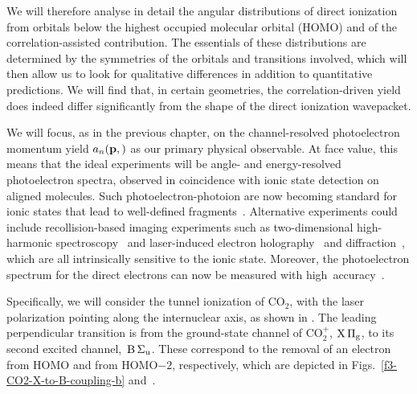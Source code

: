 We will therefore analyse in detail the angular distributions of direct ionization from orbitals below the highest occupied molecular orbital (HOMO) and of the correlation-assisted contribution. The essentials of these distributions are determined by the symmetries of the orbitals and transitions involved, which will then allow us to look for qualitative differences in addition to quantitative predictions. We will find that, in certain geometries, the correlation-driven yield does indeed differ significantly from the shape of the direct ionization wavepacket.


We will focus, as in the previous chapter, on the channel-resolved photoelectron momentum yield $a_n(\vb{p},)$ as our primary physical observable. At face value, this means that the ideal experiments will be angle- and energy-resolved photoelectron spectra, observed in coincidence with ionic state detection on aligned molecules. Such photoelectron-photoion are now becoming standard for ionic states that lead to well-defined fragments~\cite{boguslavskiy_multielectron-ionization_2012, reaction_microscope}. Alternative experiments could include recollision-based imaging experiments such as two-dimensional high-harmonic spectroscopy~\cite{shafir_resolving-tunnel-exit-times_2012} and laser-induced electron holography~\cite{spanner_reading-diffraction-images_2004, huismans_holography-2011} and diffraction~\cite{ spanner_reading-diffraction-images_2004, yurchenko_laser-induced-rescattering_2004, blaga_imaging_2012, lin_rescattering-self-imaging_2010}, which are all intrinsically sensitive to the ionic state. Moreover, the photoelectron spectrum for the direct electrons can now be measured with high~accuracy~\cite{arissian_precision-momentum-spectra_2010}.


Specifically, we will consider the tunnel ionization of CO$_2$, with the laser polarization pointing along the internuclear axis, as shown in . The leading perpendicular transition is from the ground-state channel of CO${}_2^+$, $\mathrm{X}\,\Pi_\mathrm{g}$, to its second excited channel,~$\mathrm{B}\,\Sigma_\mathrm{u}$. These correspond to the removal of an electron from HOMO and from HOMO$-2$, respectively, which are depicted in Figs.~\ref{f3-CO2-X-to-B-coupling-b} and~.

